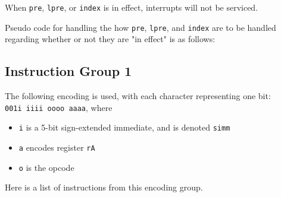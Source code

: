 \documentclass{article}
\begin{document}

	When \texttt{pre}, \texttt{lpre}, or \texttt{index} is in effect,
	interrupts will not be serviced.

	Pseudo code for handling the how \texttt{pre}, \texttt{lpre}, and
	\texttt{index} are to be handled regarding whether or not they are "in
	effect" is as follows:




	\subsection{Instruction Group 1}
	The following encoding is used, with each character representing one
	bit: \\
	\texttt{001i iiii oooo aaaa}, where

	\singlespacing
	\begin{itemize}
	\item \texttt{i} is a 5-bit sign-extended immediate, and is denoted
	\texttt{simm}
	\item \texttt{a} encodes register \texttt{rA}
	\item \texttt{o} is the opcode
	\end{itemize}
	\doublespacing

	Here is a list of instructions from this encoding group.
\end{document}
